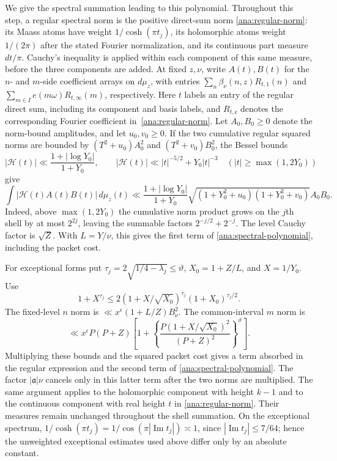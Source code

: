 We give the spectral summation leading to this polynomial. Throughout
this step, a regular spectral norm is the positive direct-sum norm
\eqref{ana:regular-norm}: its Maass atoms have weight
$1/\cosh(\pi t_j)$, its holomorphic atoms weight $1/(2\pi)$ after
the stated Fourier normalization, and its continuous part measure
$dt/\pi$. Cauchy's inequality is applied within each component of this
same measure, before the three components are added.
At fixed $z,\nu$, write $A(t),B(t)$ for the $n$- and $m$-side
coefficient arrays on $d\mu_z$, with entries
$\sum_n\beta_\nu(n,z)R_{t,1}(n)$ and
$\sum_{m\in I}e(m\omega)R_{t,\infty}(m)$, respectively.
Here $t$ labels an entry of the regular direct sum, including its
component and basis labels, and $R_{t,\mathfrak c}$ denotes the
corresponding Fourier coefficient in~\eqref{ana:regular-norm}.
Let $A_0,B_0\ge0$ denote the norm-bound amplitudes, and let
$u_0,v_0\ge0$. If the
two cumulative regular squared norms are bounded by
$(T^2+u_0)A_0^2$ and $(T^2+v_0)B_0^2$, the Bessel bounds
\[
 |\mathcal H(t)|\ll\frac{1+|\log Y_0|}{1+Y_0},\qquad
 |\mathcal H(t)|\ll |t|^{-5/2}+Y_0|t|^{-3}
 \quad(|t|\ge\max(1,2Y_0))
\]
give
\[
 \int|\mathcal H(t)A(t)B(t)|\,d\mu_z(t)
 \ll \frac{1+|\log Y_0|}{1+Y_0}
 \sqrt{(1+Y_0^2+u_0)(1+Y_0^2+v_0)}A_0B_0.
\]
Indeed, above $\max(1,2Y_0)$ the cumulative norm product grows on
the $j$th shell by at most $2^{2j}$, leaving the summable factors
$2^{-j/2}+2^{-j}$. The level Cauchy factor is $\sqrt Z$.
With $L=Y/\nu$, this gives the first term of
\eqref{ana:spectral-polynomial}, including the packet cost.

For exceptional forms put $\tau_j=2\sqrt{1/4-\lambda_j}\le\vartheta$,
$X_0=1+Z/L$, and $X=1/Y_0$. Use
\[
 1+X^{\tau_j}\le
 2(1+X/\sqrt{X_0})^{\tau_j}(1+X_0)^{\tau_j/2}.
\]
The fixed-level $n$ norm is
$\ll x^\epsilon(1+L/Z)B_\nu^2$. The common-interval $m$ norm is
\[
 \ll x^\epsilon P(P+Z)
 \left[1+\left\{
  \frac{P(1+X/\sqrt{X_0})^2}{(P+Z)^2}\right\}^{\vartheta}\right].
\]
Multiplying these bounds and the squared packet cost gives a term
absorbed in the regular expression and the second term of
\eqref{ana:spectral-polynomial}. The factor $|\mathfrak{a}|\nu$ cancels only
in this latter term after the two norms are multiplied.
The same argument applies to the holomorphic component with height
$k-1$ and to the continuous component with real height $t$ in
\eqref{ana:regular-norm}. Their measures remain unchanged throughout
the shell summation. On the exceptional spectrum,
$1/\cosh(\pi t_j)=1/\cos(\pi|\operatorname{Im}t_j|)\asymp1$,
since $|\operatorname{Im}t_j|\le7/64$; hence the unweighted
exceptional estimates used above differ only by an absolute constant.

